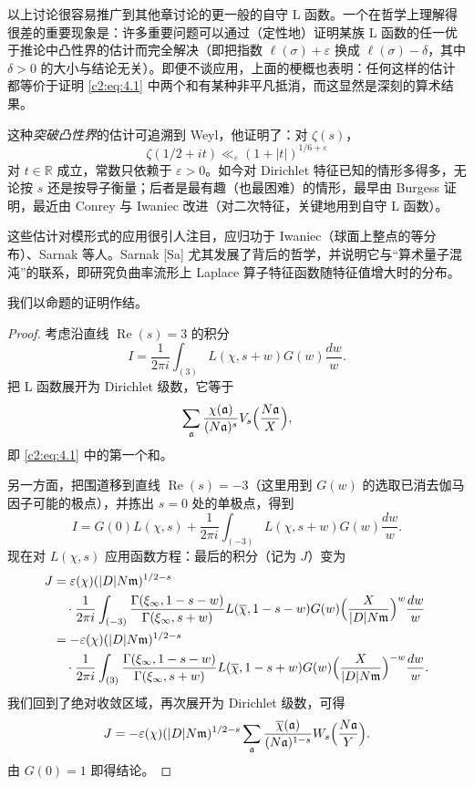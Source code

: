 以上讨论很容易推广到其他章讨论的更一般的自守 L 函数。一个在哲学上理解得很差的重要现象是：许多重要问题可以通过（定性地）证明某族 L 函数的任一优于推论中凸性界的估计而完全解决（即把指数 $\ell(\sigma)+\varepsilon$ 换成 $\ell(\sigma)-\delta$，其中 $\delta>0$ 的大小与结论无关）。即便不谈应用，上面的梗概也表明：任何这样的估计都等价于证明 \eqref{c2:eq:4.1} 中两个和有某种非平凡抵消，而这显然是深刻的算术结果。

这种\emph{突破凸性界}的估计可追溯到 Weyl，他证明了：对 $\zeta(s)$，
\[
\zeta(1/2+it)\ll_\varepsilon(1+|t|)^{1/6+\varepsilon}
\]
对 $t\in\mathbb{R}$ 成立，常数只依赖于 $\varepsilon>0$。如今对 Dirichlet 特征已知的情形多得多，无论按 $s$ 还是按导子衡量；后者是最有趣（也最困难）的情形，最早由 Burgess 证明，最近由 Conrey 与 Iwaniec 改进（对二次特征，关键地用到自守 L 函数）。

这些估计对模形式的应用很引人注目，应归功于 Iwaniec（球面上整点的等分布）、Sarnak 等人。Sarnak [Sa] 尤其发展了背后的哲学，并说明它与“算术量子混沌”的联系，即研究负曲率流形上 Laplace 算子特征函数随特征值增大时的分布。

我们以命题的证明作结。

\begin{proof}
考虑沿直线 $\operatorname{Re}(s)=3$ 的积分
\[
I=\frac{1}{2\pi i}\int_{(3)}L(\chi,s+w)G(w)\frac{dw}{w}.
\]
把 L 函数展开为 Dirichlet 级数，它等于
\[
\sum_{\mathfrak{a}}\frac{\chi(\mathfrak{a})}{(N\mathfrak{a})^s}V_s\Bigl(\frac{N\mathfrak{a}}{X}\Bigr),
\]
即 \eqref{c2:eq:4.1} 中的第一个和。

另一方面，把围道移到直线 $\operatorname{Re}(s)=-3$（这里用到 $G(w)$ 的选取已消去伽马因子可能的极点），并拣出 $s=0$ 处的单极点，得到
\[
I=G(0)L(\chi,s)+\frac{1}{2\pi i}\int_{(-3)}L(\chi,s+w)G(w)\frac{dw}{w}.
\]
现在对 $L(\chi,s)$ 应用函数方程：最后的积分（记为 $J$）变为
\begin{align*}
J&=\varepsilon(\chi)(|D|N\mathfrak{m})^{1/2-s}\\
&\quad\cdot\frac{1}{2\pi i}\int_{(-3)}\frac{\Gamma(\xi_\infty,1-s-w)}{\Gamma(\xi_\infty,s+w)}L(\overline{\chi},1-s-w)G(w)\Bigl(\frac{X}{|D|N\mathfrak{m}}\Bigr)^{w}\frac{dw}{w}\\
&=-\varepsilon(\chi)(|D|N\mathfrak{m})^{1/2-s}\\
&\quad\cdot\frac{1}{2\pi i}\int_{(3)}\frac{\Gamma(\xi_\infty,1-s-w)}{\Gamma(\xi_\infty,s+w)}L(\overline{\chi},1-s+w)G(w)\Bigl(\frac{X}{|D|N\mathfrak{m}}\Bigr)^{-w}\frac{dw}{w}.
\end{align*}
我们回到了绝对收敛区域，再次展开为 Dirichlet 级数，可得
\[
J=-\varepsilon(\chi)(|D|N\mathfrak{m})^{1/2-s}\sum_{\mathfrak{a}}\frac{\overline{\chi}(\mathfrak{a})}{(N\mathfrak{a})^{1-s}}W_s\Bigl(\frac{N\mathfrak{a}}{Y}\Bigr).
\]
由 $G(0)=1$ 即得结论。
\end{proof}

